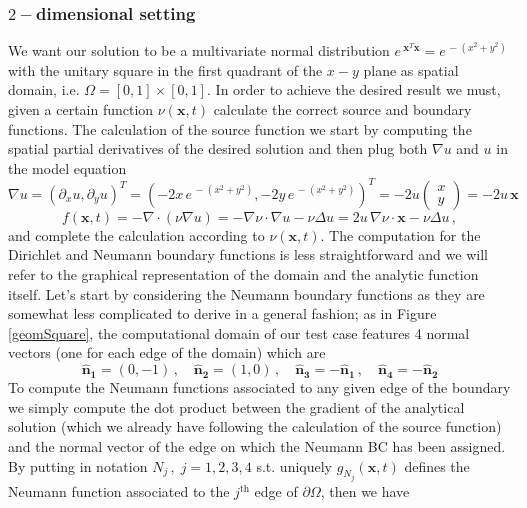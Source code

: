 \documentclass[12pt,openany,twoside,a4paper]{article}
\begin{document}
\subsubsection{$2-$dimensional setting}
We want our solution to be a multivariate normal distribution $e^{\:\mathbf{x}^T\mathbf{x}}=e^{\,-(x^2+y^2)}$ with the unitary square in the first quadrant of the $x-y$ plane as spatial domain, i.e. $\Omega = [0,1]\times[0,1]$. In order to achieve the desired result we must, given a certain function $\nu(\mathbf{x},t)$ calculate the correct source and boundary functions.
\newline The calculation of the source function we start by computing the spatial partial derivatives of the desired solution and then plug both $\nabla u$ and $u$ in the model equation
\begin{equation*}
    \nabla u = (\partial_xu, \partial_y u)^T = (-2x\,e^{\,-(x^2 + y^2)}, -2y\,e^{\,-(x^2 + y^2)})^T = - 2u\begin{pmatrix} x \\ y \end{pmatrix} = -2u\,\mathbf{x}
\end{equation*}
\begin{equation}\label{eq1}
    f(\mathbf{x},t) = -\nabla\cdot(\nu\nabla u) = -\nabla\nu\cdot\nabla u - \nu\Delta u = 2u\,\nabla\nu\cdot\mathbf{x}-\nu\Delta u\,,
\end{equation}
and complete the calculation according to $\nu(\mathbf{x},t)$.
\newline The computation for the Dirichlet and Neumann boundary functions is less straightforward and we will refer to the graphical representation of the domain and the analytic function itself. Let's start by considering the Neumann boundary functions as they are somewhat less complicated to derive in a general fashion; as in Figure \ref{geomSquare}, the computational domain of our test case features 4 normal vectors (one for each edge of the domain) which are
\begin{equation*}
    \mathbf{\hat{n}_1} = (0,-1)\,,\quad\mathbf{\hat{n}_2} = (1,0)\,,\quad\mathbf{\hat{n}_3} = -\mathbf{\hat{n}_1}\,,\quad\mathbf{\hat{n}_4} = -\mathbf{\hat{n}_2}
\end{equation*}
To compute the Neumann functions associated to any given edge of the boundary we simply compute the dot product between the gradient of the analytical solution (which we already have following the calculation of the source function) and the normal vector of the edge on which the Neumann BC has been assigned. By putting in notation $N_j\,,\;j=1,2,3,4$ s.t. uniquely $g_{N_{j}}(\mathbf{x},t)$ defines the Neumann function associated to the $j^{\text{th}}$ edge of $\partial\Omega$, then we have
\end{document}
